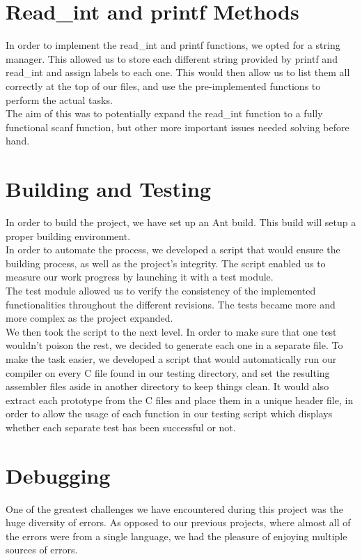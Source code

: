 \documentclass{scrartcl}
\begin{document}
\section{Read\_int and printf Methods}
In order to implement the read\_int and printf functions, we opted for a string manager. This allowed us to store each different string provided by printf and read\_int and assign labels to each one. This would then allow us to list them all correctly at the top of our files, and use the pre-implemented functions to perform the actual tasks.\\

The aim of this was to potentially expand the
read\_int function to a fully functional scanf function, but other more important issues needed solving before hand.

\section{Building and Testing}
In order to build the project, we have set up an Ant build. This build will setup a proper building environment.\\
In order to automate the process, we developed a script that would ensure the building process, as well as the project's integrity. The script enabled us to measure our work progress by launching it with a test module.\\
The test module allowed us to verify the consistency of the implemented functionalities throughout the different revisions. The tests became more and more complex as the project expanded.\\

We then took the script to the next level. In order to make sure that one test wouldn't poison the rest, we decided to generate each one in a separate file. To make the task easier, we developed a script that would automatically run our compiler on every C file found in our testing directory, and set the resulting assembler files aside in another directory to keep things clean. It would also extract each prototype from the C files and place them in a unique header file, in order to allow the usage of each function in our testing script which displays whether each separate test has been successful or not.

\section{Debugging}
One of the greatest challenges we have encountered during this project was the huge diversity of errors. As opposed to our previous projects, where almost all of the errors were from a single language, we had the pleasure of enjoying multiple sources of errors.\\
\end{document}
